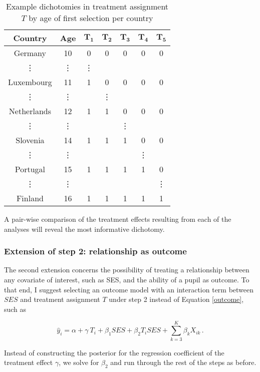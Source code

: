 \documentclass{article}
\begin{document}
\begin{table}[H]
\centering
\small
\begin{tabular}{||*{7}{c }||} 
 \hline
 \textbf{Country} & \textbf{Age} & $\mathbf{T_1}$ & $\mathbf{T_2}$ & $\mathbf{T_3}$ & $\mathbf{T_4}$ & $\mathbf{T_5}$ \\
 \hline
Germany&10&0&0&0&0&0 \\
 \hline
 \rule{0pt}{5pt}\vdots&\vdots&\vdots& & & & \\
 \hline
 Luxembourg&11&1&0&0&0&0 \\ 
 \hline
 \vdots&\vdots& &\vdots& & & \\
 \hline
Netherlands&12&1&1&0&0&0\\
\hline
\vdots&\vdots& & &\vdots& & \\
\hline
Slovenia&14&1&1&1&0&0\\
\hline
\vdots&\vdots& & & &\vdots& \\
\hline
Portugal&15&1&1&1&1&0\\
\hline
\vdots&\vdots& & & & &\vdots\\
\hline
Finland&16&1&1&1&1&1\\ 
 \hline
\end{tabular}
\caption{Example dichotomies in treatment assignment $T$ by age of first selection per country}
\label{Table:1}
\end{table}

A pair-wise comparison of the treatment effects resulting from each of the analyses will reveal the most informative dichotomy.

\subsubsection{Extension of step 2: relationship as outcome}
The second extension concerns the possibility of treating a relationship between any covariate of interest, such as SES, and the ability of a pupil as outcome. To that end, I suggest selecting an outcome model with an interaction term between $SES$ and treatment assignment $T$ under step 2 instead of Equation \ref{outcome}, such as 

\begin{equation} \label{interact}
\hat{y}_i = \alpha + \gamma \:T_i + \beta_1 SES + \beta_2 T_i SES + \sum_{k=3}^{K} \beta _k X_{ik} \, .
\end{equation}

Instead of constructing the posterior for the regression coefficient of the treatment effect $\gamma$, we solve for $\beta_2$ and run through the rest of the steps as before.
\end{document}
